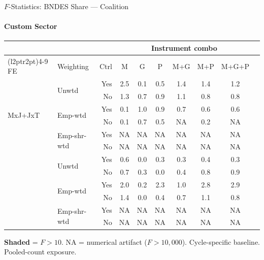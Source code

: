 \documentclass[aspectratio=169,10pt]{beamer}
\begin{document}
\begin{frame}[t]{$F$-Statistics: BNDES Share --- Coalition}
\framesubtitle{Custom Sector}
\begin{center}
\footnotesize
\setlength{\tabcolsep}{3.5pt}
\renewcommand{\arraystretch}{1.05}
\begin{tabular}{@{}llrccccccc@{}}
\toprule
 & & & \multicolumn{6}{c}{Instrument combo} \\
\cmidrule(l{2pt}r{2pt}){4-9}
FE & Weighting & Ctrl & M & G & P & M+G & M+P & M+G+P \\
\midrule
  \multirow{6}{*}{MxJ+JxT} & \multirow{2}{*}{Unwtd} & Yes & 2.5 & 0.1 & 0.5 & 1.4 & 1.4 & 1.2 \\
   &  & No & 1.3 & 0.7 & 0.9 & 1.1 & 0.8 & 0.8 \\
   & \multirow{2}{*}{Emp-wtd} & Yes & 0.1 & 1.0 & 0.9 & 0.7 & 0.6 & 0.6 \\
   &  & No & 0.1 & 0.7 & 0.5 & NA & 0.2 & NA \\
   & \multirow{2}{*}{Emp-shr-wtd} & Yes & NA & NA & NA & NA & NA & NA \\
   &  & No & NA & NA & NA & NA & NA & NA \\
\addlinespace[5pt]
  \multirow{6}{*}{MxJ+MxT} & \multirow{2}{*}{Unwtd} & Yes & 0.6 & 0.0 & 0.3 & 0.3 & 0.4 & 0.3 \\
   &  & No & 0.7 & 0.3 & 0.0 & 0.4 & 0.8 & 0.9 \\
   & \multirow{2}{*}{Emp-wtd} & Yes & 2.0 & 0.2 & 2.3 & 1.0 & 2.8 & 2.9 \\
   &  & No & 1.4 & 0.0 & 0.4 & 0.7 & 1.1 & 0.8 \\
   & \multirow{2}{*}{Emp-shr-wtd} & Yes & NA & NA & NA & NA & NA & NA \\
   &  & No & NA & NA & NA & NA & NA & NA \\
\bottomrule
\end{tabular}
\end{center}
{\scriptsize \colorbox{pass}{\textbf{Shaded}} = $F>10$. NA = numerical artifact ($F>10{,}000$). Cycle-specific baseline. Pooled-count exposure.}
\end{frame}
\end{document}
